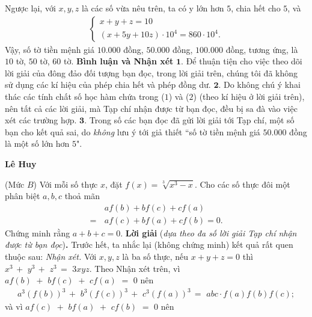 \begin{multicols}{2}
	\vskip 0.05cm
	Ngược lại, với $x, y, z$ là các số vừa nêu trên, ta có y lớn hơn $5$, chia hết cho $5$, và
	\begin{align*}
		\begin{cases}
			x + y + z = 10\\
			(x + 5y + 10z) \cdot 10^4 = 860 \cdot 10^4.
		\end{cases}
	\end{align*}
	Vậy, số tờ tiền mệnh giá $10{.}000$ đồng, $50{.}000$ đồng, $100{.}000$ đồng, tương ứng, là $10$ tờ, $50$ tờ, $60$ tờ.
	\vskip 0.05cm
	\textbf{Bình luận và Nhận xét}
	\vskip 0.05cm	
	$\pmb{1.}$ Để thuận tiện cho việc theo dõi lời giải của đông đảo đối tượng bạn đọc, trong lời giải trên, chúng tôi đã không sử dụng các kí hiệu của phép chia hết và phép đồng dư.
	\vskip 0.05cm
	$\pmb{2.}$ Do không chú ý khai thác các tính chất số học hàm chứa trong ($1$) và ($2$) (theo kí hiệu ở lời giải trên), nên tất cả các lời giải, mà Tạp chí nhận được từ bạn đọc, đều bị sa đà vào việc xét các trường hợp.
	\vskip 0.05cm
	$\pmb{3.}$ Trong số các bạn đọc đã gửi lời giải tới Tạp chí, một số bạn cho kết quả sai, do \textit{không} lưu ý tới giả thiết ``số tờ tiền mệnh giá $50{.}000$ đồng là một số lớn hơn $5$".
	\begin{flushright}
		\textbf{Lê Huy}
	\end{flushright}
	{}
	(Mức $B$) Với mỗi số thực $x$, đặt $f(x)=\sqrt[3]{x^3-x}$. Cho các số thực đôi một phân biệt $a,b,c$ thoả mãn
	\begin{align*}
		&a f(b)+b f(c)+c f(a)\\
		=\,&a f(c)+b f(a)+c f(b)=0.
	\end{align*}
	Chứng minh rằng $a+b+c=0$. 
	\vskip 0.05cm
	\textbf{Lời giải} (\textit{dựa theo đa số lời giải Tạp chí nhận được từ bạn đọc})\textbf{.}
	\vskip 0.05cm
	Trước hết, ta nhắc lại (không chứng minh) kết quả rất quen thuộc sau:
	\vskip 0.05cm
	\textit{Nhận xét.} Với $x, y, z$ là ba số thực, nếu $x + y + z = 0$ thì ${x^3}\, + \,\,{y^3}\, + \,\,{z^3}\, = \,\,3xyz.$   
	\vskip 0.05cm
	Theo Nhận xét trên, vì $af\left( b \right)\,\, + \,\,bf\left( c \right)\,\, + \,\,cf\left( a \right)\,\, = \,\,0$  nên
	\begin{align*}
		{a^3}{\left( {f\left( b \right)} \right)^3}\, + \,\,{b^3}{\left( {f\left( c \right)} \right)^3}\, + \,\,{c^3}{\left( {f\left( a \right)} \right)^3}\, = \,\,abc \cdot f\left( a \right)f\left( b \right)f\left( c \right);
	\end{align*}
	và vì $af\left( c \right)\,\, + \,\,bf\left( a \right)\,\, + \,\,cf\left( b \right)\,\, = \,\,0$  nên 

\end{multicols}
